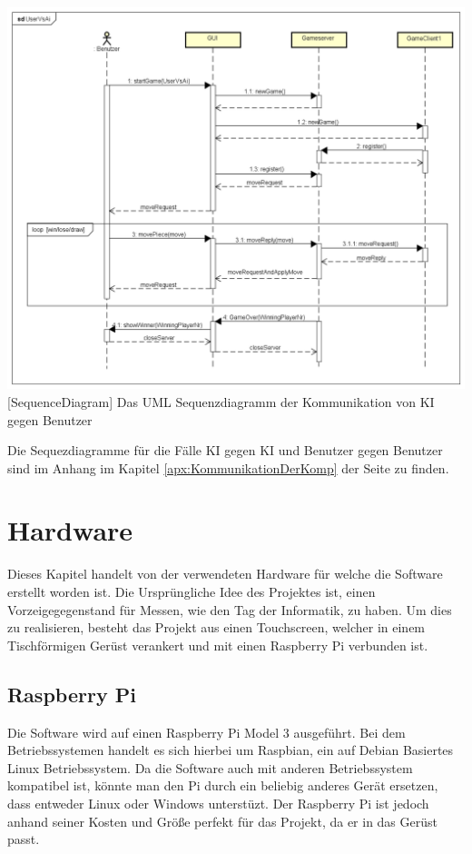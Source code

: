 \documentclass[12pt,a4paper,bibliography=totocnumbered,listof=totocnumbered]{article}
\begin{document}
\vspace{1em}
\begin{minipage}{\linewidth}
	\centering
	\includegraphics[width=0.83\linewidth]{pics/UserVsAiCommunication.png}
	[SequenceDiagram]{ Das UML Sequenzdiagramm der Kommunikation von KI gegen Benutzer}
	\label{fig:UserVsUserSequenceDiagram}
\end{minipage}

Die Sequezdiagramme für die Fälle KI gegen KI und Benutzer gegen Benutzer sind im Anhang im Kapitel \ref{apx:KommunikationDerKomp} 
der Seite \pageref{apx:KommunikationDerKomp} zu finden.

\pagebreak
\section{Hardware}
Dieses Kapitel handelt von der verwendeten Hardware für welche die Software erstellt worden ist. 
Die Ursprüngliche Idee des Projektes ist, einen Vorzeigegegenstand für Messen, wie den Tag der Informatik, zu haben.
Um dies zu realisieren, besteht das Projekt aus einen Touchscreen, welcher in einem Tischförmigen Gerüst verankert 
und mit einen Raspberry Pi verbunden ist.

\subsection{Raspberry Pi}
Die Software wird auf einen Raspberry Pi Model 3 ausgeführt. Bei dem Betriebssystemen handelt es sich hierbei um 
Raspbian, ein auf Debian Basiertes Linux Betriebssystem. \cite{RaspberryPi} Da die Software auch mit anderen Betriebssystem
kompatibel ist, könnte man den Pi durch ein beliebig anderes Gerät ersetzen, dass entweder Linux oder Windows unterstüzt.
Der Raspberry Pi ist jedoch anhand seiner Kosten und Größe perfekt für das Projekt, da er in das Gerüst passt.
\end{document}
